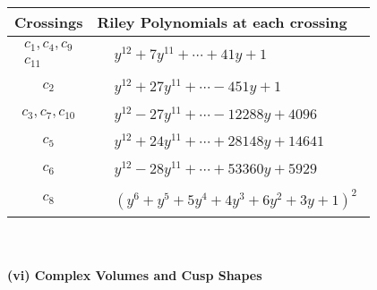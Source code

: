 \documentclass[1p]{elsarticle_modified}
\theoremstyle{definition}
\begin{document}
\begin{tabular}{m{50pt}|m{274pt}}
Crossings & \hspace{64pt}Riley Polynomials at each crossing \\
\hline $$\begin{aligned}c_{1},c_{4},c_{9}\\c_{11}\end{aligned}$$&$\begin{aligned}
&y^{12}+7 y^{11}+\cdots+41 y+1
\end{aligned}$\\
\hline $$\begin{aligned}c_{2}\end{aligned}$$&$\begin{aligned}
&y^{12}+27 y^{11}+\cdots-451 y+1
\end{aligned}$\\
\hline $$\begin{aligned}c_{3},c_{7},c_{10}\end{aligned}$$&$\begin{aligned}
&y^{12}-27 y^{11}+\cdots-12288 y+4096
\end{aligned}$\\
\hline $$\begin{aligned}c_{5}\end{aligned}$$&$\begin{aligned}
&y^{12}+24 y^{11}+\cdots+28148 y+14641
\end{aligned}$\\
\hline $$\begin{aligned}c_{6}\end{aligned}$$&$\begin{aligned}
&y^{12}-28 y^{11}+\cdots+53360 y+5929
\end{aligned}$\\
\hline $$\begin{aligned}c_{8}\end{aligned}$$&$\begin{aligned}
&(y^6+y^5+5 y^4+4 y^3+6 y^2+3 y+1)^2
\end{aligned}$\\
\hline
\end{tabular}\\~\\
\newpage\flushleft \textbf{(vi) Complex Volumes and Cusp Shapes}
\end{document}
